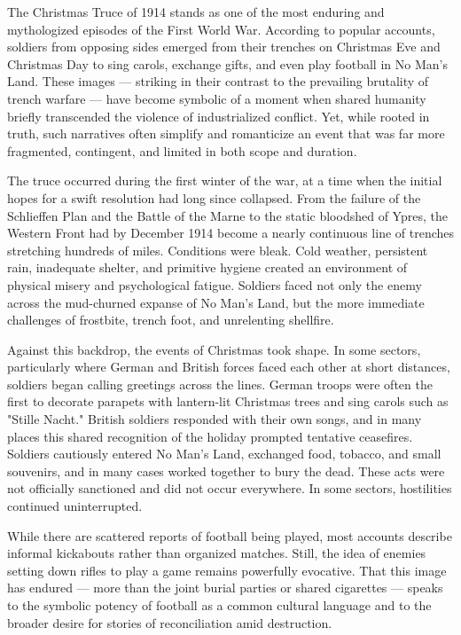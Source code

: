 The Christmas Truce of 1914 stands as one of the most enduring and mythologized episodes of the First World War. According to popular accounts, soldiers from opposing sides emerged from their trenches on Christmas Eve and Christmas Day to sing carols, exchange gifts, and even play football in No Man’s Land. These images — striking in their contrast to the prevailing brutality of trench warfare — have become symbolic of a moment when shared humanity briefly transcended the violence of industrialized conflict. Yet, while rooted in truth, such narratives often simplify and romanticize an event that was far more fragmented, contingent, and limited in both scope and duration.

The truce occurred during the first winter of the war, at a time when the initial hopes for a swift resolution had long since collapsed. From the failure of the Schlieffen Plan and the Battle of the Marne to the static bloodshed of Ypres, the Western Front had by December 1914 become a nearly continuous line of trenches stretching hundreds of miles. Conditions were bleak. Cold weather, persistent rain, inadequate shelter, and primitive hygiene created an environment of physical misery and psychological fatigue. Soldiers faced not only the enemy across the mud-churned expanse of No Man’s Land, but the more immediate challenges of frostbite, trench foot, and unrelenting shellfire.

Against this backdrop, the events of Christmas took shape. In some sectors, particularly where German and British forces faced each other at short distances, soldiers began calling greetings across the lines. German troops were often the first to decorate parapets with lantern-lit Christmas trees and sing carols such as "Stille Nacht." British soldiers responded with their own songs, and in many places this shared recognition of the holiday prompted tentative ceasefires. Soldiers cautiously entered No Man’s Land, exchanged food, tobacco, and small souvenirs, and in many cases worked together to bury the dead. These acts were not officially sanctioned and did not occur everywhere. In some sectors, hostilities continued uninterrupted.

While there are scattered reports of football being played, most accounts describe informal kickabouts rather than organized matches. Still, the idea of enemies setting down rifles to play a game remains powerfully evocative. That this image has endured — more than the joint burial parties or shared cigarettes — speaks to the symbolic potency of football as a common cultural language and to the broader desire for stories of reconciliation amid destruction.

